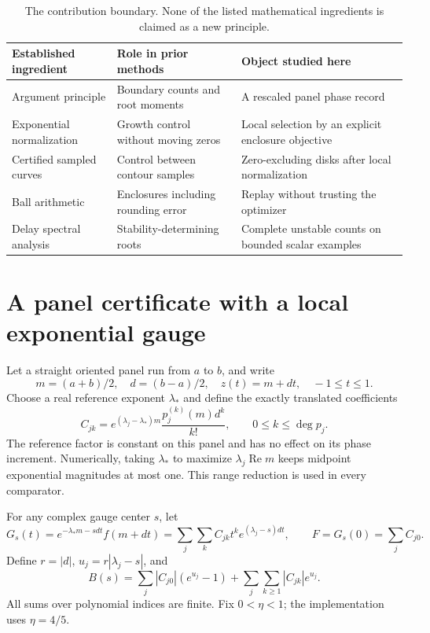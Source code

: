 \documentclass[11pt,a4paper]{article}
\DeclareMathOperator{\Repart}{Re}
\begin{document}
\begin{table}[t]
\centering\small
\begin{tabular}{p{.28\linewidth}p{.29\linewidth}p{.33\linewidth}}
\toprule
Established ingredient & Role in prior methods & Object studied here\\\midrule
Argument principle & Boundary counts and root moments & A rescaled panel phase record\\
Exponential normalization & Growth control without moving zeros & Local selection by an explicit enclosure objective\\
Certified sampled curves & Control between contour samples & Zero-excluding disks after local normalization\\
Ball arithmetic & Enclosures including rounding error & Replay without trusting the optimizer\\
Delay spectral analysis & Stability-determining roots & Complete unstable counts on bounded scalar examples\\
\bottomrule
\end{tabular}
\caption{The contribution boundary. None of the listed mathematical ingredients is claimed as a new principle.}
\label{tab:scope}
\end{table}

\section{A panel certificate with a local exponential gauge}
Let a straight oriented panel run from $a$ to $b$, and write
\begin{equation}
 m=(a+b)/2,\quad d=(b-a)/2,\quad z(t)=m+dt,\quad -1\le t\le1.
\end{equation}
Choose a real reference exponent $\lambda_*$ and define the exactly translated coefficients
\begin{equation}\label{eq:coeff}
 C_{jk}=e^{(\lambda_j-\lambda_*)m}\frac{p_j^{(k)}(m)d^k}{k!},
 \qquad 0\le k\le\deg p_j.
\end{equation}
The reference factor is constant on this panel and has no effect on its phase increment. Numerically, taking $\lambda_*$ to maximize $\lambda_j\Repart m$ keeps midpoint exponential magnitudes at most one. This range reduction is used in every comparator.

For any complex gauge center $s$, let
\begin{equation}\label{eq:gauge}
 G_s(t)=e^{-\lambda_*m-sdt}f(m+dt)
       =\sum_j\sum_k C_{jk}t^k e^{(\lambda_j-s)dt},
 \qquad F=G_s(0)=\sum_j C_{j0}.
\end{equation}
Define $r=|d|$, $u_j=r|\lambda_j-s|$, and
\begin{equation}\label{eq:bound}
 B(s)=\sum_j |C_{j0}|(e^{u_j}-1)
       +\sum_j\sum_{k\ge1}|C_{jk}|e^{u_j}.
\end{equation}
All sums over polynomial indices are finite. Fix $0<\eta<1$; the implementation uses $\eta=4/5$.
\end{document}

